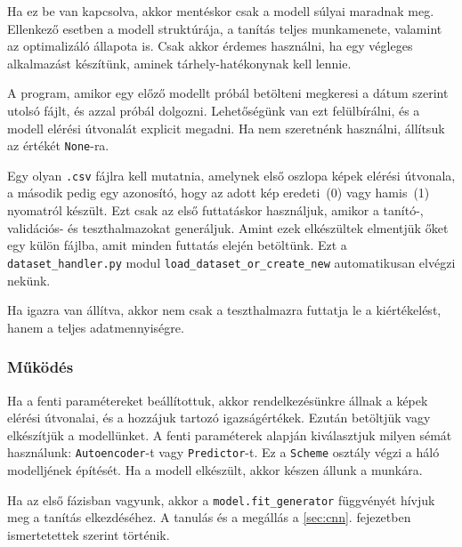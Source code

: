 
Ha ez be van kapcsolva, akkor mentéskor csak a modell súlyai maradnak meg. Ellenkező esetben
a modell struktúrája, a tanítás teljes munkamenete, valamint az optimalizáló állapota is.
Csak akkor érdemes használni, ha egy végleges alkalmazást készítünk, aminek tárhely-hatékonynak 
kell lennie.



A program, amikor egy előző modellt próbál betölteni megkeresi a dátum szerint utolsó
fájlt, és azzal próbál dolgozni. Lehetőségünk van ezt felülbírálni, és a modell elérési
útvonalát explicit megadni. Ha nem szeretnénk használni, állítsuk az értékét \texttt{None}-ra.



Egy olyan \texttt{.csv} fájlra kell mutatnia, amelynek első oszlopa képek elérési útvonala,
a második pedig egy azonosító, hogy az adott kép eredeti~(0) vagy hamis~(1) nyomatról készült.
Ezt csak az első futtatáskor használjuk, amikor a tanító-, validációs- és teszthalmazokat 
generáljuk. Amint ezek elkészültek elmentjük őket egy külön fájlba, amit minden futtatás elején
betöltünk. Ezt a \texttt{dataset\_handler.py} modul \texttt{load\_dataset\_or\_create\_new} 
automatikusan elvégzi nekünk.



Ha igazra van állítva, akkor nem csak a teszthalmazra futtatja le a kiértékelést, hanem 
a teljes adatmennyiségre. 


\subsubsection{Működés}

Ha a fenti paramétereket beállítottuk, akkor rendelkezésünkre állnak a képek elérési
útvonalai, és a hozzájuk tartozó igazságértékek. Ezután betöltjük vagy elkészítjük a 
modellünket. A fenti paraméterek alapján kiválasztjuk milyen sémát használunk: 
\texttt{Autoencoder}-t vagy \texttt{Predictor}-t. Ez a \texttt{Scheme} osztály végzi a háló
modelljének építését. Ha a modell elkészült, akkor készen állunk a munkára.


Ha az első fázisban vagyunk, akkor a \texttt{model.fit\_generator} függvényét hívjuk meg
a tanítás elkezdéséhez. A tanulás és a megállás a \ref{sec:cnn}. fejezetben ismertetettek 
szerint történik.


